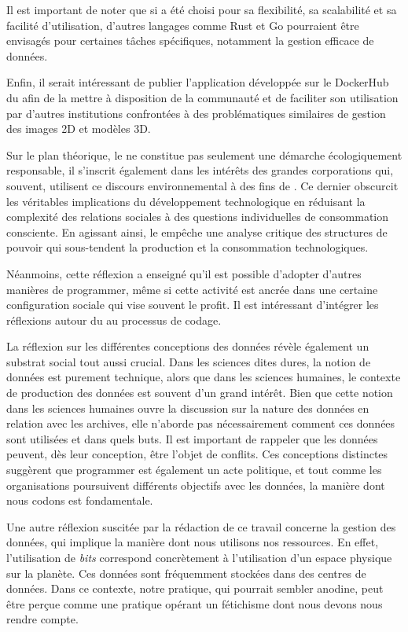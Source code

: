 Il est important de noter que si \py a été choisi pour sa flexibilité, sa scalabilité et sa facilité d'utilisation, d'autres langages comme Rust et Go pourraient être envisagés pour certaines tâches spécifiques, notamment la gestion efficace de données.

Enfin, il serait intéressant de publier l'application développée sur le DockerHub du \dsc afin de la mettre à disposition de la communauté et de faciliter son utilisation par d'autres institutions confrontées à des problématiques similaires de gestion des images 2D et modèles 3D.

Sur le plan théorique, le \gco ne constitue pas seulement une démarche écologiquement responsable, il s’inscrit également dans les intérêts des grandes corporations qui, souvent, utilisent ce discours environnemental à des fins de \gwsh. Ce dernier obscurcit les véritables implications du développement technologique en réduisant la complexité des relations sociales à des questions individuelles de consommation consciente. En agissant ainsi, le \gwsh empêche une analyse critique des structures de pouvoir qui sous-tendent la production et la consommation technologiques.

Néanmoins, cette réflexion a enseigné qu’il est possible d’adopter d’autres manières de programmer, même si cette activité est ancrée dans une certaine configuration sociale qui vise souvent le profit. Il est intéressant d'intégrer les réflexions autour du \gco au processus de codage.

La réflexion sur les différentes conceptions des données révèle également un substrat social tout aussi crucial. Dans les sciences dites dures, la notion de données est purement technique, alors que dans les sciences humaines, le contexte de production des données est souvent d’un grand intérêt. Bien que cette notion dans les sciences humaines ouvre la discussion sur la nature des données en relation avec les archives, elle n’aborde pas nécessairement comment ces données sont utilisées et dans quels buts. Il est important de rappeler que les données peuvent, dès leur conception, être l’objet de conflits. Ces conceptions distinctes suggèrent que programmer est également un acte politique, et tout comme les organisations poursuivent différents objectifs avec les données, la manière dont nous codons est fondamentale.

Une autre réflexion suscitée par la rédaction de ce travail concerne la gestion des données, qui implique la manière dont nous utilisons nos ressources. En effet, l’utilisation de \textit{bits} correspond concrètement à l’utilisation d’un espace physique sur la planète. Ces données sont fréquemment stockées dans des centres de données. Dans ce contexte, notre pratique, qui pourrait sembler anodine, peut être perçue comme une pratique opérant un fétichisme dont nous devons nous rendre compte. 

